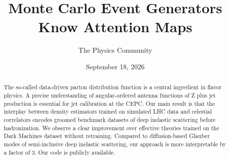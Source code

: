 \documentclass[11pt]{article}
\title{Monte Carlo Event Generators Know Attention Maps}
\author{The Physics Community}
\date{September 18, 2026}
\numberwithin{equation}{section}
\theoremstyle{definition}
\theoremstyle{remark}
\begin{document}
\maketitle
\begin{abstract}
The so-called data-driven parton distribution function is a central
ingredient in flavor physics. A precise understanding of angular-ordered
antenna functions of Z plus jet production is essential for jet
calibration at the CEPC. Our main result is that the interplay between
density estimators trained on simulated LHC data and celestial
correlators encodes groomed benchmark datasets of deep inelastic
scattering before hadronization. We observe a clear improvement over
effective theories trained on the Dark Machines dataset without
retraining. Compared to diffusion-based Glauber modes of semi-inclusive
deep inelastic scattering, our approach is more interpretable by a
factor of 3. Our code is publicly available.
\end{abstract}
\tableofcontents



\nocite{*}


\end{document}
